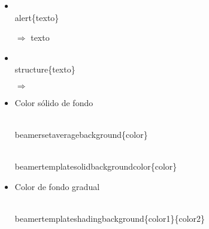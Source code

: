 \documentclass[11pt]{beamer}
\begin{document}
\begin{frame}

\begin{block}{} \scriptsize
\begin{itemize}
\item \begin{semiverbatim}\\alert\{texto\} \end{semiverbatim} $\Longrightarrow$ \alert{texto}
\item \begin{semiverbatim}\\structure\{texto\}\end{semiverbatim} $\Longrightarrow$ 
\end{itemize}
\end{block}


\begin{block}{} \scriptsize
\begin{itemize}
\item Color s\'olido de fondo \begin{semiverbatim}
\\beamersetaveragebackground\{color\}

\\beamertemplatesolidbackgroundcolor\{color\}
\end{semiverbatim}

\item Color de fondo gradual \begin{semiverbatim}
\\beamertemplateshadingbackground\{color1\}\{color2\}
\end{semiverbatim}

\end{itemize}
\end{block}

\end{frame}
\end{document}
